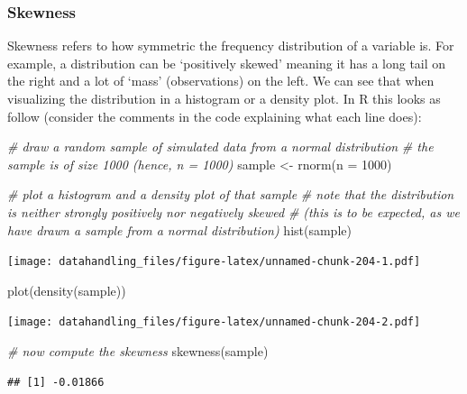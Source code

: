 \documentclass[
  12pt,
]{style/krantz}
\newenvironment{Shaded}{\begin{snugshade}}{\end{snugshade}}
\newcommand{\AttributeTok}[1]{\textcolor[rgb]{0.77,0.63,0.00}{#1}}
\newcommand{\CommentTok}[1]{\textcolor[rgb]{0.56,0.35,0.01}{\textit{#1}}}
\newcommand{\DecValTok}[1]{\textcolor[rgb]{0.00,0.00,0.81}{#1}}
\newcommand{\FunctionTok}[1]{\textcolor[rgb]{0.00,0.00,0.00}{#1}}
\newcommand{\NormalTok}[1]{#1}
\newcommand{\OtherTok}[1]{\textcolor[rgb]{0.56,0.35,0.01}{#1}}
\begin{document}
\hypertarget{skewness}{%
\subsubsection{Skewness}\label{skewness}}

Skewness refers to how symmetric the frequency distribution of a variable is. For example, a distribution can be `positively skewed' meaning it has a long tail on the right and a lot of `mass' (observations) on the left. We can see that when visualizing the distribution in a histogram or a density plot. In R this looks as follow (consider the comments in the code explaining what each line does):

\begin{Shaded}
\begin{Highlighting}[]
\CommentTok{\# draw a random sample of simulated data from a normal distribution}
\CommentTok{\# the sample is of size 1000 (hence, n = 1000)}
\NormalTok{sample }\OtherTok{\textless{}{-}} \FunctionTok{rnorm}\NormalTok{(}\AttributeTok{n =} \DecValTok{1000}\NormalTok{)}

\CommentTok{\# plot a histogram and a density plot of that sample}
\CommentTok{\# note that the distribution is neither strongly positively nor negatively skewed}
\CommentTok{\# (this is to be expected, as we have drawn a sample from a normal distribution)}
\FunctionTok{hist}\NormalTok{(sample)}
\end{Highlighting}
\end{Shaded}

\texttt{[image: datahandling\_files/figure-latex/unnamed-chunk-204-1.pdf]}

\begin{Shaded}
\begin{Highlighting}[]
\FunctionTok{plot}\NormalTok{(}\FunctionTok{density}\NormalTok{(sample))}
\end{Highlighting}
\end{Shaded}

\texttt{[image: datahandling\_files/figure-latex/unnamed-chunk-204-2.pdf]}

\begin{Shaded}
\begin{Highlighting}[]
\CommentTok{\# now compute the skewness}
\FunctionTok{skewness}\NormalTok{(sample)}
\end{Highlighting}
\end{Shaded}

\begin{verbatim}
## [1] -0.01866
\end{verbatim}
\end{document}
